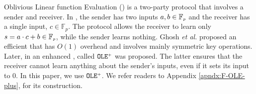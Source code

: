 Oblivious Linear function Evaluation (\ole) is a two-party protocol that involves a sender and receiver. In \ole,  the sender  has two  inputs  $a, b\in \mathbb{F}_{\scriptscriptstyle p}$ and the receiver has a single input, $c \in \mathbb{F}_{p}$.  The protocol allows the receiver to learn only $s = a\cdot c + b \in \mathbb{F}_{\scriptscriptstyle p}$, while the sender learns nothing. Ghosh \textit{et al.} \cite{GhoshNN17} proposed an efficient \ole that has $O(1)$ overhead and involves mainly symmetric key operations. Later, in \cite{GhoshN19} an enhanced \ole, called $\mathtt{OLE}^{\scriptscriptstyle +}$ was proposed. The latter ensures that the receiver cannot learn anything about the sender's inputs,  even if it sets its input to $0$. In this paper, we use $\mathtt{OLE}^{\scriptscriptstyle +}$. We refer readers to Appendix \ref{apndx:F-OLE-plus}, for its construction.  %

\vspace{-1mm}












